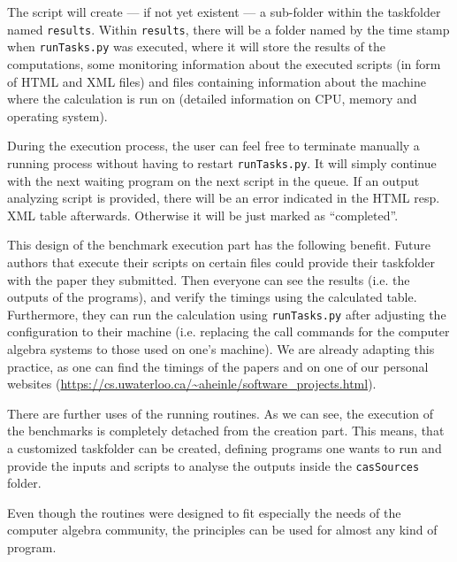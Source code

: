 \documentclass[12pt]{article}
\begin{document}
The script will create --- if not yet existent --- a sub-folder within the
taskfolder named \texttt{results}. Within \texttt{results}, there will be a
folder named by the time stamp when \texttt{runTasks.py} was executed, where it
will store the results of the computations, some monitoring information about
the executed scripts (in form of \textsc{HTML} and \textsc{XML} files) and
files containing information about the machine where the calculation is run on
(detailed information on CPU, memory and operating system).

During the execution process, the user can feel free to terminate manually a
running process without having to restart \texttt{runTasks.py}. It will simply
continue with the next waiting program on the next script in the queue. If an
output analyzing script is provided, there will be an error indicated in the
\textsc{HTML} resp. \textsc{XML} table afterwards. Otherwise it will be just
marked as ``completed''.

This design of the benchmark execution part has the following benefit. Future
authors that execute their scripts on certain files could provide their
taskfolder with the paper they submitted. Then everyone can see the results
(i.e. the outputs of the programs), and verify the timings using the calculated
table. Furthermore, they can run the calculation using \texttt{runTasks.py}
after adjusting the configuration to their machine (i.e. replacing the call
commands for the computer algebra systems to those used on one's machine). We
are already adapting this practice, as one can find the timings of the papers
\cite{giesbrecht2014factoring} and \cite{heinle2013factorization} on one of our
personal websites
(\url{https://cs.uwaterloo.ca/~aheinle/software_projects.html}).


There are further uses of the running routines. As we can see, the execution of
the benchmarks is completely detached from the creation part. This means, that
a customized taskfolder can be created, defining programs one wants to run and
provide the inputs and scripts to analyse the outputs inside the
\texttt{casSources} folder.

Even though the routines were designed to fit especially the needs of the
computer algebra community, the principles can be used for almost any kind of
program.
\end{document}
